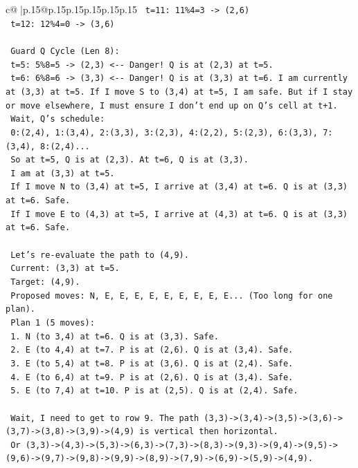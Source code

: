 \documentclass{article}
\begin{document}
{\begin{supertabular}{c@{$\;$}|p{.15\linewidth}@{}p{.15\linewidth}p{.15\linewidth}p{.15\linewidth}p{.15\linewidth}p{.15\linewidth}}
{{{\texttt{  t=11: 11\%4=3 {-}> (2,6)} \\
\texttt{  t=12: 12\%4=0 {-}> (3,6)} \\
\\ 
\texttt{  Guard Q Cycle (Len 8):} \\
\texttt{  t=5: 5\%8=5 {-}> (2,3)  <{-}{-} Danger! Q is at (2,3) at t=5.} \\
\texttt{  t=6: 6\%8=6 {-}> (3,3)  <{-}{-} Danger! Q is at (3,3) at t=6. I am currently at (3,3) at t=5. If I move S to (3,4) at t=5, I am safe. But if I stay or move elsewhere, I must ensure I don't end up on Q's cell at t+1.} \\
\texttt{  Wait, Q's schedule:} \\
\texttt{  0:(2,4), 1:(3,4), 2:(3,3), 3:(2,3), 4:(2,2), 5:(2,3), 6:(3,3), 7:(3,4), 8:(2,4)...} \\
\texttt{  So at t=5, Q is at (2,3). At t=6, Q is at (3,3).} \\
\texttt{  I am at (3,3) at t=5.} \\
\texttt{  If I move N to (3,4) at t=5, I arrive at (3,4) at t=6. Q is at (3,3) at t=6. Safe.} \\
\texttt{  If I move E to (4,3) at t=5, I arrive at (4,3) at t=6. Q is at (3,3) at t=6. Safe.} \\
\\ 
\texttt{  Let's re{-}evaluate the path to (4,9).} \\
\texttt{  Current: (3,3) at t=5.} \\
\texttt{  Target: (4,9).} \\
\texttt{  Proposed moves: N, E, E, E, E, E, E, E, E, E... (Too long for one plan).} \\
\texttt{  Plan 1 (5 moves):} \\
\texttt{  1. N (to 3,4) at t=6. Q is at (3,3). Safe.} \\
\texttt{  2. E (to 4,4) at t=7. P is at (2,6). Q is at (3,4). Safe.} \\
\texttt{  3. E (to 5,4) at t=8. P is at (3,6). Q is at (2,4). Safe.} \\
\texttt{  4. E (to 6,4) at t=9. P is at (2,6). Q is at (3,4). Safe.} \\
\texttt{  5. E (to 7,4) at t=10. P is at (2,5). Q is at (2,4). Safe.} \\
\\ 
\texttt{  Wait, I need to get to row 9. The path (3,3){-}>(3,4){-}>(3,5){-}>(3,6){-}>(3,7){-}>(3,8){-}>(3,9){-}>(4,9) is vertical then horizontal.} \\
\texttt{  Or (3,3){-}>(4,3){-}>(5,3){-}>(6,3){-}>(7,3){-}>(8,3){-}>(9,3){-}>(9,4){-}>(9,5){-}>(9,6){-}>(9,7){-}>(9,8){-}>(9,9){-}>(8,9){-}>(7,9){-}>(6,9){-}>(5,9){-}>(4,9).} \\
}}}
\end{supertabular}}
\end{document}
